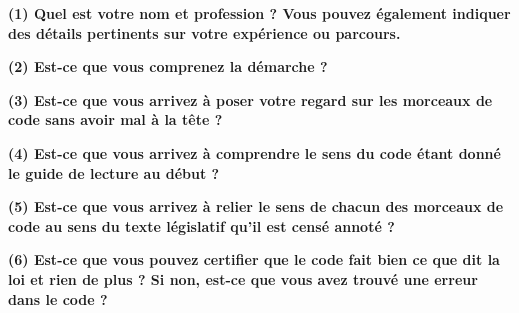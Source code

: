 \documentclass[12pt, french]{article}
\begin{document}
\label{form}
\begin{Form}
  \begin{center}
  \textbf{(1) Quel est votre nom et profession ? Vous pouvez également indiquer des détails pertinents sur votre expérience ou parcours.}\\[1em]

    \TextField[multiline=true, width=\textwidth]{}
  \end{center}
  \begin{center}
  \textbf{(2) Est-ce que vous comprenez la démarche ?}\\[1em]

    \TextField[multiline=true, width=\textwidth]{}
  \end{center}
  \begin{center}
  \textbf{(3) Est-ce que vous arrivez à poser votre regard sur les morceaux de code sans avoir mal à la tête ?}\\[1em]

    \TextField[multiline=true, width=\textwidth]{}
  \end{center}
  \begin{center}
  \textbf{(4) Est-ce que vous arrivez à comprendre le sens du code étant donné le guide de lecture au début ?}\\[1em]

    \TextField[multiline=true, width=\textwidth]{}
  \end{center}
  \begin{center}
  \textbf{(5) Est-ce que vous arrivez à relier le sens de chacun des morceaux de code au sens du texte législatif qu'il est censé annoté ?}\\[1em]

    \TextField[multiline=true, width=\textwidth]{}
  \end{center}
  \begin{center}
  \textbf{(6) Est-ce que vous pouvez certifier que le code fait bien ce que dit la loi et rien de plus ? Si non, est-ce que vous avez trouvé une erreur dans le code ?}\\[1em]

    \TextField[multiline=true, width=\textwidth]{}
  \end{center}
\end{Form}
\end{document}
